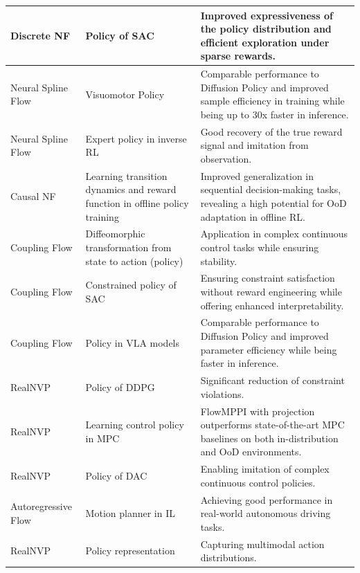 \begin{xltabular}{\linewidth}{p{3.5cm} p{3.5cm} X}
\hline
Discrete NF \citep{ward2019sacnf,offpolicy2020} & Policy of SAC & Improved expressiveness of the policy distribution and efficient exploration under sparse rewards. \\
\hline
Neural Spline Flow \citep{lind2025normalizingflowscapablevisuomotor} & Visuomotor Policy & Comparable performance to Diffusion Policy and improved sample efficiency in training while being up to 30x faster in inference. \\
\hline
Neural Spline Flow \citep{chang2022ilflowimitationlearningobservation} & Expert policy in inverse RL & Good recovery of the true reward signal and imitation from observation. \\
\hline
Causal NF \citep{cho2024outofdistributionadaptationofflinerl} & Learning transition dynamics and reward function in offline policy training & Improved generalization in sequential decision-making tasks, revealing a high potential for OoD adaptation in offline RL. \\
\hline
Coupling Flow \citep{stableflow2021, Consensus2022} & Diffeomorphic transformation from state to action (policy) & Application in complex continuous control tasks while ensuring stability. \\
\hline
Coupling Flow \citep{rietz2024constrained} & Constrained policy of SAC & Ensuring constraint satisfaction without reward engineering while offering enhanced interpretability. \\
\hline
Coupling Flow \citep{tarasov2025vla} & Policy in VLA models & Comparable performance to Diffusion Policy and improved parameter efficiency while being faster in inference. \\
\hline
RealNVP \citep{NEURIPS2023_3fd9fe8e} & Policy of DDPG & Significant reduction of constraint violations. \\
\hline
RealNVP \citep{power2022variationalinferencempcusing} & Learning control policy in MPC & FlowMPPI with projection outperforms state-of-the-art MPC baselines on both in-distribution and OoD environments. \\
\hline
RealNVP \citep{damian2021} & Policy of DAC & Enabling imitation of complex continuous control policies. \\
\hline
Autoregressive Flow \citep{agarwal2022imitativeplanning} & Motion planner in IL & Achieving good performance in real-world autonomous driving tasks. \\
\hline
RealNVP \citep{ma2020normalizingflowpolicy} & Policy representation & Capturing multimodal action distributions. \\

\end{xltabular}
